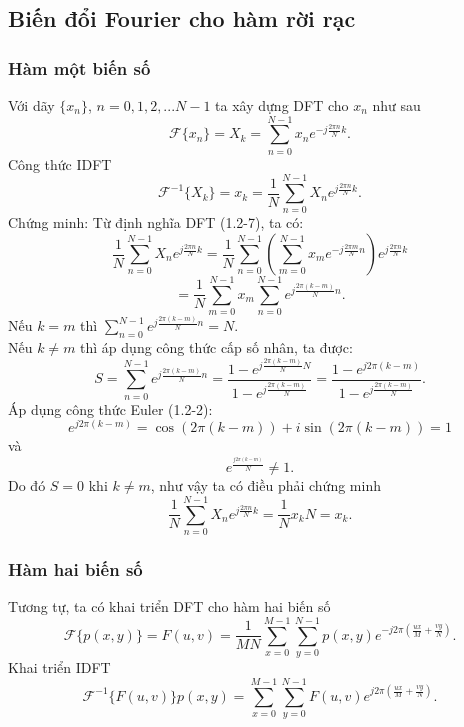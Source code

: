 \subsection{Biến đổi Fourier cho hàm rời rạc}
\subsubsection{Hàm một biến số}
Với dãy $\{x_n\}$, $n=0, 1, 2,... N-1$ ta xây dựng DFT cho $x_n$ như sau 
\begin{equation}
\mathcal{F} \{x_n\} = {X_k} = \sum\limits_{n = 0}^{N-1} {{x_n}{e^{ - j\frac{{2\pi n}}{N}k}}} .\tag{1.2-7}
\end{equation}
Công thức IDFT
\begin{equation}
\mathcal{F}^{-1}\{X_k\} = {x_k} = \frac{1}{N}\sum\limits_{n = 0}^{N-1} {{X_n}{e^{j\frac{{2\pi n}}{N}k}}} .\tag{1.2-8}
\end{equation}
Chứng minh:
Từ định nghĩa DFT (1.2-7), ta có:
$$\frac{1}{N}\sum\limits_{n = 0}^{N-1} {{X_n}{e^{j\frac{{2\pi n}}{N}k}}} = \frac{1}{N}\sum\limits_{n = 0}^{N-1} {{
(\sum\limits_{m = 0}^{N-1} {{x_m}{e^{ - j\frac{{2\pi m}}{N}n}}})
}{e^{j\frac{{2\pi n}}{N}k}}} $$
$$=\frac{1}{N}\sum\limits_{m = 0}^{N-1} {{x_m}\sum\limits_{n = 0}^{N-1} {{e^{j\frac{{2\pi (k - m)}}{N}n}}} }
.$$
Nếu $k=m$ thì $\sum\limits_{n = 0}^{N-1} {{e^{j\frac{{2\pi (k - m)}}{N}n}}}=N.$\\
Nếu $k\neq m$ thì áp dụng công thức cấp số nhân, ta được:
$$S = \sum\limits_{n = 0}^{N-1} {{e^{j\frac{{2\pi (k - m)}}{N}n}}}
= \frac{{1 - {e^{j\frac{{2\pi (k - m)}}{N}N}}}}{{1 - {e^{j\frac{{2\pi (k - m)}}{N}}}}} = \frac{{1 - {e^{j2\pi (k-m)}}}}{{1 - {e^{j\frac{{2\pi (k - m)}}{N}}}}}.$$
Áp dụng công thức Euler (1.2-2):
$${e^{j2\pi (k - m)}} = \cos (2\pi (k - m)) + i\sin (2\pi (k - m)) = 1 $$
và
$${e^{\frac{{^{j2\pi (k - m)}}}{N}}} \ne 1 .$$
Do đó $S=0$ khi $k\neq m$, như vậy ta có điều phải chứng minh
$$\frac{1}{N}\sum\limits_{n = 0}^{N-1} {{X_n}{e^{j\frac{{2\pi n}}{N}k}}}= \frac{1}{N}x_k N = x_k.$$
\subsubsection{Hàm hai biến số}
Tương tự, ta có khai triển DFT cho hàm hai biến số
\begin{equation}
\mathcal{F} \{p(x,y)\} = F(u,v) = \frac{1}{{MN}}\sum\limits_{x = 0}^{M - 1} {\sum\limits_{y = 0}^{N - 1} {p(x,y){e^{ - j2\pi (\frac{{ux}}{M} + \frac{{vy}}{N})}}} } .\tag{1.2-9}
\end{equation}
Khai triển IDFT
\begin{equation}
\mathcal{F}^{-1} \{F(u,v)\}
p(x,y) = \sum\limits_{x = 0}^{M - 1} {\sum\limits_{y = 0}^{N - 1} {F(u,v){e^{j2\pi (\frac{{ux}}{M} + \frac{{vy}}{N})}}} }.\tag{1.2-10}
\end{equation}
